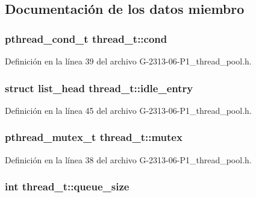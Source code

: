 \subsection{Documentación de los datos miembro}
\subsubsection[{\texorpdfstring{cond}{cond}}]{\setlength{\rightskip}{0pt plus 5cm}pthread\+\_\+cond\+\_\+t thread\+\_\+t\+::cond}\hypertarget{structthread__t_a6cb846b84c59d01a8b3a2693d39a4af1}{}\label{structthread__t_a6cb846b84c59d01a8b3a2693d39a4af1}


Definición en la línea 39 del archivo G-\/2313-\/06-\/\+P1\+\_\+thread\+\_\+pool.\+h.

\subsubsection[{\texorpdfstring{idle\+\_\+entry}{idle_entry}}]{\setlength{\rightskip}{0pt plus 5cm}struct {\bf list\+\_\+head} thread\+\_\+t\+::idle\+\_\+entry}\hypertarget{structthread__t_a9386032d478cacdfd680d5691e0eb9d3}{}\label{structthread__t_a9386032d478cacdfd680d5691e0eb9d3}


Definición en la línea 45 del archivo G-\/2313-\/06-\/\+P1\+\_\+thread\+\_\+pool.\+h.

\subsubsection[{\texorpdfstring{mutex}{mutex}}]{\setlength{\rightskip}{0pt plus 5cm}pthread\+\_\+mutex\+\_\+t thread\+\_\+t\+::mutex}\hypertarget{structthread__t_abb0dcb82ff12b61776b74c76fa27c964}{}\label{structthread__t_abb0dcb82ff12b61776b74c76fa27c964}


Definición en la línea 38 del archivo G-\/2313-\/06-\/\+P1\+\_\+thread\+\_\+pool.\+h.

\subsubsection[{\texorpdfstring{queue\+\_\+size}{queue_size}}]{\setlength{\rightskip}{0pt plus 5cm}int thread\+\_\+t\+::queue\+\_\+size}\hypertarget{structthread__t_aa99eeab6834595bdff5a7da08314fd89}{}\label{structthread__t_aa99eeab6834595bdff5a7da08314fd89}


